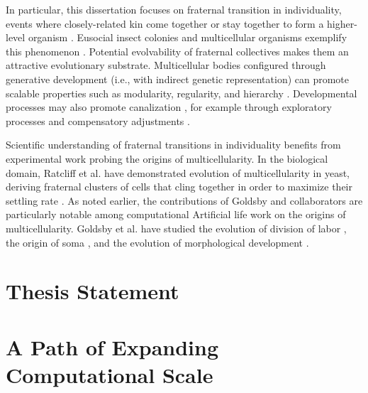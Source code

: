 In particular, this dissertation focuses on fraternal transition in individuality, events where closely-related kin come together or stay together to form a higher-level organism \citep{queller1997cooperators}.
Eusocial insect colonies and multicellular organisms exemplify this phenomenon \citep{smith1997major}.
Potential evolvability of fraternal collectives makes them an attractive evolutionary substrate.
Multicellular bodies configured through generative development (i.e., with indirect genetic representation) can promote scalable properties \citep{lipson2007principles} such as modularity, regularity, and hierarchy \citep{hornby2005measuring, clune2011performance}.
Developmental processes may also promote canalization \citep{stanley2003taxonomy}, for example through exploratory processes and compensatory adjustments \citep{gerhart2007theory}.

Scientific understanding of fraternal transitions in individuality benefits from experimental work probing the origins of multicellularity.
In the biological domain, Ratcliff et al. have demonstrated evolution of multicellularity in yeast, deriving fraternal clusters of cells that cling together in order to maximize their settling rate \citep{ratcliff2012experimental}.
As noted earlier, the contributions of Goldsby and collaborators are particularly notable among computational Artificial life work on the origins of multicellularity.
Goldsby et al. have studied the evolution of division of labor \citep{goldsby2010evolution, goldsby2012task}, the origin of soma \citep{goldsby2014evolutionary}, and the evolution of morphological development \citep{goldsby2017increasing}.

\section{Thesis Statement}

\noindent{}

\section{A Path of Expanding Computational Scale}

